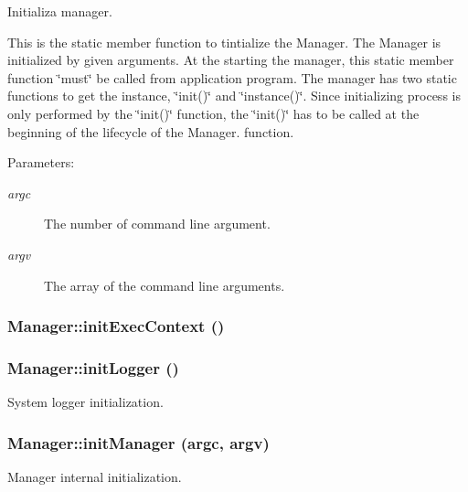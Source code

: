 Initializa manager. 

This is the static member function to tintialize the Manager. The Manager is initialized by given arguments. At the starting the manager, this static member function \char`\"{}must\char`\"{} be called from application program. The manager has two static functions to get the instance, \char`\"{}init()\char`\"{} and \char`\"{}instance()\char`\"{}. Since initializing process is only performed by the \char`\"{}init()\char`\"{} function, the \char`\"{}init()\char`\"{} has to be called at the beginning of the lifecycle of the Manager. function.

\begin{Desc}
\item[Parameters:]
\begin{description}
\item[{\em argc}]The number of command line argument. \item[{\em argv}]The array of the command line arguments.\end{description}
\end{Desc}
\subsubsection{\setlength{\rightskip}{0pt plus 5cm}Manager::init\-Exec\-Context ()}\label{classManager_Managera34}


\subsubsection{\setlength{\rightskip}{0pt plus 5cm}Manager::init\-Logger ()}\label{classManager_Managera27}


System logger initialization. 

\subsubsection{\setlength{\rightskip}{0pt plus 5cm}Manager::init\-Manager (argc, argv)}\label{classManager_Managera25}


Manager internal initialization. 

